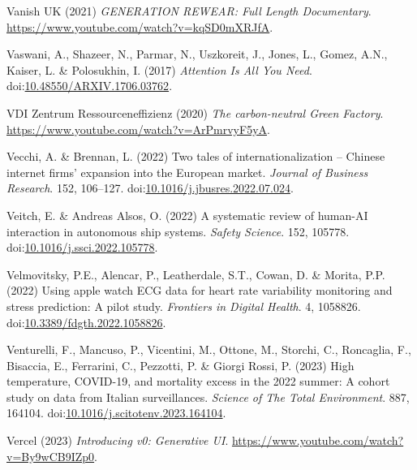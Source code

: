 \documentclass[
  letterpaper,
  DIV=11,
  numbers=noendperiod]{scrartcl}
\newlength{\cslhangindent}
\newenvironment{CSLReferences}[2] %
 {\begin{list}{}{%
  \setlength{\itemindent}{0pt}
  \setlength{\leftmargin}{0pt}
  \setlength{\parsep}{0pt}
  \ifodd #1
   \setlength{\leftmargin}{\cslhangindent}
   \setlength{\itemindent}{-1\cslhangindent}
  \fi
  \setlength{\itemsep}{#2\baselineskip}}}
 {\end{list}}
\begin{document}
\begin{CSLReferences}{0}{1}
Vanish UK (2021) \emph{{GENERATION REWEAR}: {Full Length Documentary}}.
\url{https://www.youtube.com/watch?v=kqSD0mXRJfA}.

Vaswani, A., Shazeer, N., Parmar, N., Uszkoreit, J., Jones, L., Gomez,
A.N., Kaiser, L. \& Polosukhin, I. (2017) \emph{Attention {Is All You
Need}}.
doi:\href{https://doi.org/10.48550/ARXIV.1706.03762}{10.48550/ARXIV.1706.03762}.

VDI Zentrum Ressourceneffizienz (2020) \emph{The carbon-neutral {Green
Factory}}. \url{https://www.youtube.com/watch?v=ArPmrvyF5yA}.

Vecchi, A. \& Brennan, L. (2022) Two tales of internationalization --
{Chinese} internet firms' expansion into the {European} market.
\emph{Journal of Business Research}. 152, 106--127.
doi:\href{https://doi.org/10.1016/j.jbusres.2022.07.024}{10.1016/j.jbusres.2022.07.024}.

Veitch, E. \& Andreas Alsos, O. (2022) A systematic review of human-{AI}
interaction in autonomous ship systems. \emph{Safety Science}. 152,
105778.
doi:\href{https://doi.org/10.1016/j.ssci.2022.105778}{10.1016/j.ssci.2022.105778}.

Velmovitsky, P.E., Alencar, P., Leatherdale, S.T., Cowan, D. \& Morita,
P.P. (2022) Using apple watch {ECG} data for heart rate variability
monitoring and stress prediction: {A} pilot study. \emph{Frontiers in
Digital Health}. 4, 1058826.
doi:\href{https://doi.org/10.3389/fdgth.2022.1058826}{10.3389/fdgth.2022.1058826}.

Venturelli, F., Mancuso, P., Vicentini, M., Ottone, M., Storchi, C.,
Roncaglia, F., Bisaccia, E., Ferrarini, C., Pezzotti, P. \& Giorgi
Rossi, P. (2023) High temperature, {COVID-19}, and mortality excess in
the 2022 summer: A cohort study on data from {Italian} surveillances.
\emph{Science of The Total Environment}. 887, 164104.
doi:\href{https://doi.org/10.1016/j.scitotenv.2023.164104}{10.1016/j.scitotenv.2023.164104}.

Vercel (2023) \emph{Introducing v0: {Generative UI}}.
\url{https://www.youtube.com/watch?v=By9wCB9IZp0}.


\end{CSLReferences}
\end{document}
